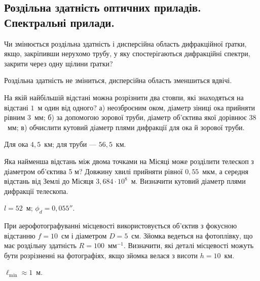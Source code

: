 \subsection*{Роздільна здатність оптичних приладів. Спектральні прилади.}


\begin{problem}%
    Чи змінюється роздільна здатність і дисперсійна область дифракційної
    ґратки, якщо, закріпивши нерухомо трубу, у яку спостерігаються
    дифракційні спектри, закрити через одну щілини ґратки?
    \begin{solution}
        Роздільна здатність не зміниться, дисперсійна область зменшиться вдвічі.
    \end{solution}
\end{problem}


\begin{problem}%
    На якій найбільшій відстані можна розрізнити два стовпи, які знаходяться на відстані $ 1 $~м один від одного? а) неозброєним оком, діаметр зіниці ока прийняти рівним $ 3 $~мм; б) за допомогою зорової труби, діаметр об'єктива якої дорівнює $ 38 $~мм; в) обчислити кутовий діаметр плями дифракції для ока й зорової труби.
    \begin{solution}
        Для ока $4,5$~км; для труби --- $56,5$~км.
    \end{solution}
\end{problem}


\begin{problem}%
    Яка найменша відстань між двома точками на Місяці може розділити
    телескоп з діаметром об'єктива 5 м? Довжину хвилі прийняти рівної
    $ 0,55 $~мкм, а середня відстань від Землі до Місяця $ 3,684\cdot10^8 $~м. Визначити кутовий діаметр плями дифракції телескопа.
    \begin{solution}
        $l = 52$~м; $\phi_d = 0,055''$.
    \end{solution}
\end{problem}


\begin{problem}%
    При аерофотографуванні місцевості використовується об'єктив з фокусною відстанню $ f = 10 $~см і діаметром $ D = 5 $~см. Зйомка ведеться на фотоплівку, що має роздільну здатність $ R = 100 $~мм$^{-1}$. Визначити, які деталі місцевості можуть бути розрізненні на фотографіях, якщо зйомка велася з висоти $ h = 10 $~км.
    \begin{solution}
        $\ell_{\min}\approx 1$~м.
    \end{solution}
\end{problem}


